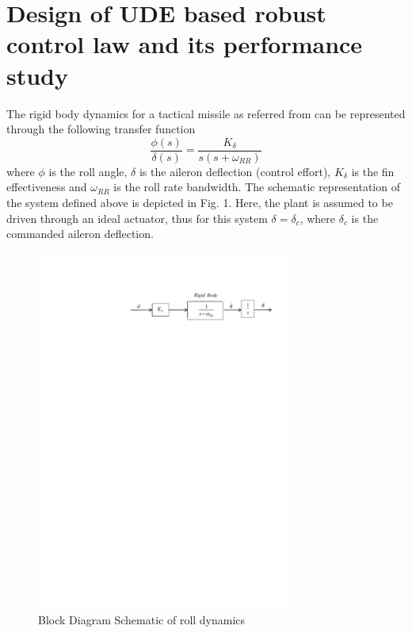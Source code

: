 \documentclass[conference]{IEEEtran}
\begin{document}
\section{Design of UDE based robust control law and its performance study}
The rigid body dynamics for a tactical missile as referred from \cite{talole2011} can be represented through the following transfer function
\begin{equation}
\frac{\phi(s)}{\delta(s)} = \frac{K_{\delta}}{s(s + \omega_{RR})}
\label{eq1}
\end{equation}
%
where $\phi$ is the roll angle, $\delta$ is the aileron deflection (control effort), $K_\delta$ is the fin effectiveness and $\omega_{RR}$ is the roll rate bandwidth. 
The schematic representation of the system defined above is depicted in Fig. 1. Here, the plant is assumed to be driven through an ideal actuator, thus for this system $\delta=\delta_c$, where $\delta_c$ is the commanded aileron deflection.
\begin{figure}[h]
\begin{center}
\includegraphics[width=8.4cm]{fig1}    %
\caption{Block Diagram Schematic of roll dynamics} 
\label{fig1}
\end{center}
\end{figure}
\end{document}

